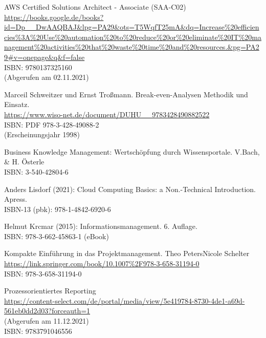 \begin{thebibliography}{SW11} %
   AWS Certified Solutions Architect - Associate (SAA-C02)\\
  \url{https://books.google.de/books?id=Dp__DwAAQBAJ&lpg=PA29&ots=T5WqfT25mA&dq=Increase%20efficiencies%3A%20Use%20automation%20to%20reduce%20or%20eliminate%20IT%20management%20activities%20that%20waste%20time%20and%20resources.&pg=PA29#v=onepage&q&f=false}
  \\ISBN: 9780137325160
  \\(Abgerufen am 02.11.2021)
  
   Marceil Schweitzer und Ernst Troßmann. Break-even-Analysen Methodik und Einsatz.\\
  \url{https://www.wiso-net.de/document/DUHU__9783428490882522}\\  
  ISBN: PDF 978-3-428-49088-2\\
  (Erscheinungsjahr 1998)
  
   Business Knowledge Management: Wertschöpfung durch Wissensportale. V.Bach, \& H. Österle\\
  ISBN: 3-540-42804-6
 
   Anders Lisdorf (2021): Cloud Computing Basics: a Non.-Technical Introduction. Apress.\\ 
  ISBN-13 (pbk): 978-1-4842-6920-6 
  
 Helmut Krcmar (2015): Informationsmanagement. 6. Auflage.\\ 
  ISBN: 978-3-662-45863-1 (eBook)
  
   Kompakte Einführung in das Projektmanagement. Theo PetersNicole Schelter
  \url{https://link.springer.com/book/10.1007%2F978-3-658-31194-0}
  \\ISBN: 978-3-658-31194-0

   Prozessorientiertes Reporting \\
  \url{https://content-select.com/de/portal/media/view/5e419784-8730-4de1-a69d-561eb0dd2d03?forceauth=1}\\
  (Abgerufen am 11.12.2021)\\
  ISBN: 9783791046556
\end{thebibliography}

